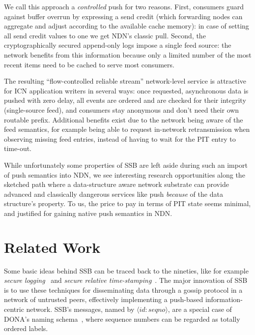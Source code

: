 \documentclass[9pt,sigconf]{acmart}
\begin{document}
We call this approach a \textit{controlled} push for two
reasons. First, consumers guard against buffer overrun by expressing a
send credit (which forwarding nodes can aggregate and adjust according
to the available cache memory): in case of setting all send credit
values to one we get NDN's classic pull. Second, the cryptographically
secured append-only logs impose a single feed source: the network
benefits from this information because only a limited number of the
most recent items need to be cached to serve most consumers.

The resulting ``flow-controlled reliable stream'' network-level
service is attractive for ICN application writers in several ways:
once requested, asynchronous data is pushed with zero delay, all
events are ordered and are checked for their integrity (single-source
feed), and consumers stay anonymous and don't need their own routable
prefix. Additional benefits exist due to the network being aware of
the feed semantics, for example being able to request in-network
retransmission when observing missing feed entries, instead of having
to wait for the PIT entry to time-out.

While unfortunately some properties of SSB are left aside during such
an import of push semantics into NDN, we see interesting research
opportunities along the sketched path where a data-structure aware
network substrate can provide advanced and classically dangerous
services like push {\em because} of the data structure's property. To
us, the price to pay in terms of PIT state seems minimal, and
justified for gaining native push semantics in NDN.



\section{Related Work}
\label{sect:relwork}

Some basic ideas behind SSB can be traced back to the nineties, like
for example {\em secure logging}~\cite{schneier1998cryptographic} and
{\em secure relative time-stamping}~\cite{haber1990time}. The major
innovation of SSB is to use these techniques for disseminating data
through a gossip protocol in a network of untrusted peers, effectively
implementing a push-based information-centric network. SSB's messages,
named by $\langle id:seqno\rangle$, are a special case of DONA's
naming schema~\cite{Koponen:2007:DNA:1282380.1282402}, where sequence
numbers can be regarded as totally ordered labels.
\end{document}
